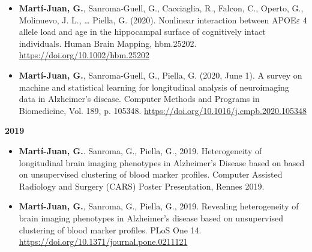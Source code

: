 \documentclass[12pt, b5paper,twoside]{tesi_upf}
\begin{document}
\begin{itemize}
\item \textbf{Martí‐Juan, G.}, Sanroma‐Guell, G., Cacciaglia, R., Falcon, C., Operto, G., Molinuevo, J. L., … Piella, G. (2020). Nonlinear interaction between APOE$\varepsilon$ 4 allele load and age in the hippocampal surface of cognitively intact individuals. Human Brain Mapping, hbm.25202. \url{https://doi.org/10.1002/hbm.25202}

\item \textbf{Martí-Juan, G.}, Sanroma-Guell, G., Piella, G. (2020, June 1). A survey on machine and statistical learning for longitudinal analysis of neuroimaging data in Alzheimer’s disease. Computer Methods and Programs in Biomedicine, Vol. 189, p. 105348. \url{https://doi.org/10.1016/j.cmpb.2020.105348}
\end{itemize}

\textbf{2019}

\begin{itemize}

\item \textbf{Martí-Juan, G.}. Sanroma, G., Piella, G., 2019. Heterogeneity of longitudinal brain imaging phenotypes in Alzheimer's Disease based on based on unsupervised clustering of blood marker profiles. Computer Assisted Radiology and Surgery (CARS) Poster Presentation, Rennes 2019.

\item \textbf{Martí-Juan, G.}, Sanroma, G., Piella, G., 2019. Revealing heterogeneity of brain imaging phenotypes in Alzheimer’s disease based on unsupervised clustering of blood marker profiles. PLoS One 14. \url{https://doi.org/10.1371/journal.pone.0211121}
\end{itemize}

\printindex
\end{document}
